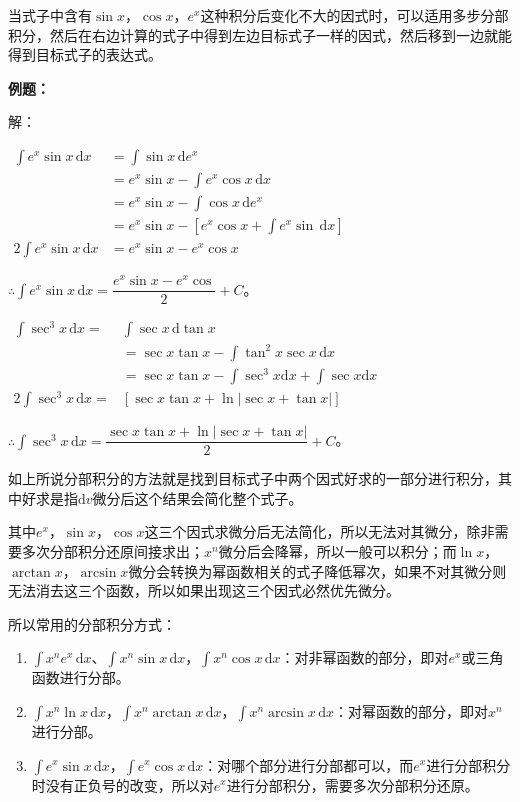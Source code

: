 \documentclass[UTF8, 12pt]{ctexart}
\begin{document}
当式子中含有$\sin x$，$\cos x$，$e^x$这种积分后变化不大的因式时，可以适用多步分部积分，然后在右边计算的式子中得到左边目标式子一样的因式，然后移到一边就能得到目标式子的表达式。

\textbf{例题：}\medskip

解：

$
\begin{aligned}
    \int e^x\sin x\,\textrm{d}x & =\int\sin x\,\textrm{d}e^x \\
    & =e^x\sin x-\int e^x\cos x\,\textrm{d}x \\
    & =e^x\sin x-\int\cos x\,\textrm{d}e^x \\
    & =e^x\sin x-\left[e^x\cos x+\int e^x\sin\,\textrm{d}x\right] \\
    2\int e^x\sin x\,\textrm{d}x & =e^x\sin x-e^x\cos x
\end{aligned}
$

$\therefore\int e^x\sin x\,\textrm{d}x=\dfrac{e^x\sin x-e^x\cos}{2}+C$。

$
\begin{aligned}
    \int\sec^3x\,\textrm{d}x =&\int\sec x\,\textrm{d}\tan x \\
    & =\sec x\tan x-\int\tan^2x\sec x\,\textrm{d}x \\
    & =\sec x\tan x-\int\sec^3x\textrm{d}x+\int\sec x\textrm{d}x \\
    2\int\sec^3x\,\textrm{d}x =&[\sec x\tan x+\ln\vert\sec x+\tan x\vert]
\end{aligned}
$

$\therefore\int\sec^3x\,\textrm{d}x =\dfrac{\sec x\tan x+\ln\vert\sec x+\tan x\vert}{2}+C$。

如上所说分部积分的方法就是找到目标式子中两个因式好求的一部分进行积分，其中好求是指$\textrm{d}v$微分后这个结果会简化整个式子。

其中$e^x$，$\sin x$，$\cos x$这三个因式求微分后无法简化，所以无法对其微分，除非需要多次分部积分还原间接求出；$x^n$微分后会降幂，所以一般可以积分；而$\ln x$，$\arctan x$，$\arcsin x$微分会转换为幂函数相关的式子降低幂次，如果不对其微分则无法消去这三个函数，所以如果出现这三个因式必然优先微分。

所以常用的分部积分方式：

\begin{enumerate}
    \item $\int x^ne^x\,\textrm{d}x$、$\int x^n\sin x\,\textrm{d}x$，$\int x^n\cos x\,\textrm{d}x$：对非幂函数的部分，即对$e^x$或三角函数进行分部。
    \item $\int x^n\ln x\,\textrm{d}x$，$\int x^n\arctan x\,\textrm{d}x$，$\int x^n\arcsin x\,\textrm{d}x$：对幂函数的部分，即对$x^n$进行分部。
    \item $\int e^x\sin x\,\textrm{d}x$，$\int e^x\cos x\,\textrm{d}x$：对哪个部分进行分部都可以，而$e^x$进行分部积分时没有正负号的改变，所以对$e^x$进行分部积分，需要多次分部积分还原。
\end{enumerate}
\end{document}
